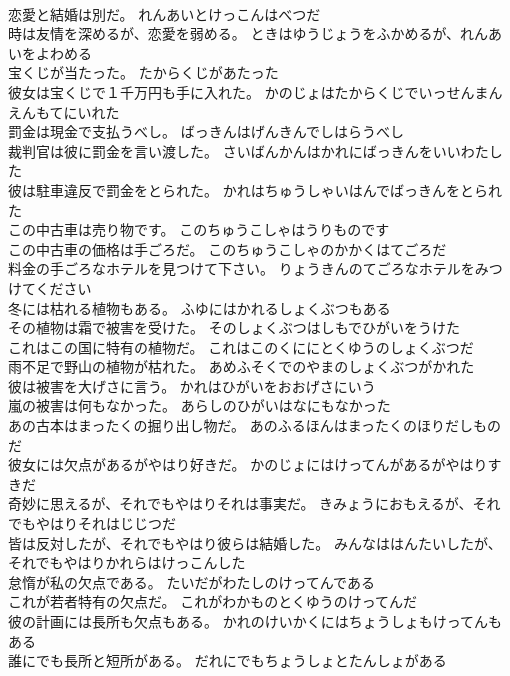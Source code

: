 \documentclass[8pt]{extreport}
\begin{document}
\begin{CJK}{UTF8}{min}
\\	恋愛と結婚は別だ。	れんあいとけっこんはべつだ 
\\	時は友情を深めるが、恋愛を弱める。	ときはゆうじょうをふかめるが、れんあいをよわめる 
\\	宝くじが当たった。	たからくじがあたった 
\\	彼女は宝くじで１千万円も手に入れた。	かのじょはたからくじでいっせんまんえんもてにいれた 
\\	罰金は現金で支払うべし。	ばっきんはげんきんでしはらうべし 
\\	裁判官は彼に罰金を言い渡した。	さいばんかんはかれにばっきんをいいわたした 
\\	彼は駐車違反で罰金をとられた。	かれはちゅうしゃいはんでばっきんをとられた 
\\	この中古車は売り物です。	このちゅうこしゃはうりものです 
\\	この中古車の価格は手ごろだ。	このちゅうこしゃのかかくはてごろだ 
\\	料金の手ごろなホテルを見つけて下さい。	りょうきんのてごろなホテルをみつけてください 
\\	冬には枯れる植物もある。	ふゆにはかれるしょくぶつもある 
\\	その植物は霜で被害を受けた。	そのしょくぶつはしもでひがいをうけた 
\\	これはこの国に特有の植物だ。	これはこのくににとくゆうのしょくぶつだ 
\\	雨不足で野山の植物が枯れた。	あめふそくでのやまのしょくぶつがかれた 
\\	彼は被害を大げさに言う。	かれはひがいをおおげさにいう 
\\	嵐の被害は何もなかった。	あらしのひがいはなにもなかった 
\\	あの古本はまったくの掘り出し物だ。	あのふるほんはまったくのほりだしものだ 
\\	彼女には欠点があるがやはり好きだ。	かのじょにはけってんがあるがやはりすきだ 
\\	奇妙に思えるが、それでもやはりそれは事実だ。	きみょうにおもえるが、それでもやはりそれはじじつだ 
\\	皆は反対したが、それでもやはり彼らは結婚した。	みんなははんたいしたが、それでもやはりかれらはけっこんした 
\\	怠惰が私の欠点である。	たいだがわたしのけってんである 
\\	これが若者特有の欠点だ。	これがわかものとくゆうのけってんだ 
\\	彼の計画には長所も欠点もある。	かれのけいかくにはちょうしょもけってんもある 
\\	誰にでも長所と短所がある。	だれにでもちょうしょとたんしょがある 

\end{CJK}
\end{document}
